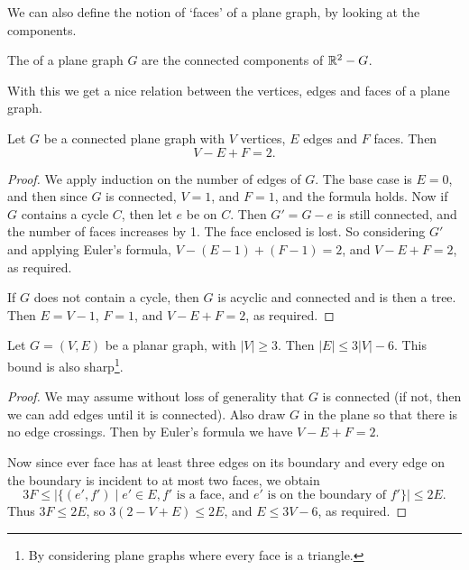 \documentclass[a4paper]{scrreprt}
\begin{document}
We can also define the notion of `faces' of a plane graph, by looking at the components.

\begin{definition}[Faces]
	The  of a plane graph $G$ are the connected components of $\mathbb{R}^2 - G$.
\end{definition}

With this we get a nice relation between the vertices, edges and faces of a plane graph.

\begin{theorem}
	Let $G$ be a connected plane graph with $V$ vertices, $E$ edges and $F$ faces. Then
	$$
	V - E + F = 2.
	$$
\end{theorem}
\begin{proof}
	We apply induction on the number of edges of $G$. The base case is $E = 0$, and then since $G$ is connected, $V = 1$, and $F = 1$, and the formula holds. 
	Now if $G$ contains a cycle $C$, then let $e$ be on $C$. Then $G' = G - e$ is still connected, and the number of faces increases by 1. The face enclosed is lost. So considering $G'$ and applying Euler's formula, $V - (E - 1) + (F - 1) = 2$, and $V - E + F = 2$, 
	as required.

	If $G$ does not contain a cycle, then $G$ is acyclic and connected and is then a tree. Then $E = V - 1$, $F = 1$, and $V - E + F = 2$, as required.
\end{proof}

\begin{corollary}
	Let $G = (V, E)$ be a planar graph, with $|V| \geq 3$. Then $|E| \leq 3|V| - 6$. This bound is also sharp\footnote{By considering plane graphs where every face is a triangle.}.
\end{corollary}
\begin{proof}
	We may assume without loss of generality that $G$ is connected (if not, then we can add edges until it is connected). Also draw $G$ in the plane so that there is no edge crossings. Then by Euler's formula we have $V - E + F = 2$.

	Now since ever face has at least three edges on its boundary and every edge on the boundary is incident to at most two faces, we obtain
	$$
	3F \leq \left|\{(e', f') \mid e' \in E, f' \text{ is a face, and } e' \text{ is on the boundary of }f'\}\right| \leq 2E.
	$$
	Thus $3F \leq 2E$, so $3(2 - V + E) \leq 2E$, and $E \leq 3V - 6$, as required.
\end{proof}
\end{document}
